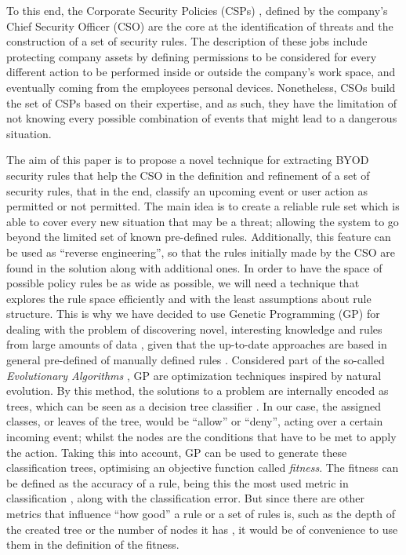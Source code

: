 \documentclass[a4paper,10pt,twocolumn,preprint,3p]{elsarticle}
\begin{document}
To this end, the Corporate Security Policies (CSPs) \cite{Kaeo:2003:DNS:1201807}, 
defined by the company's Chief Security Officer (CSO) are the core at the
identification of threats and the construction of a set of security rules. The description of these jobs include protecting
company assets by defining permissions to be considered for every
different action to be performed inside or outside the company's work
space, and eventually coming from the employees personal
devices. Nonetheless, CSOs build the set of CSPs based on their
expertise, and as such, they have the limitation of not knowing every
possible combination of events that might lead to a dangerous
situation. 

The aim of this paper is to propose a novel technique for extracting
BYOD security rules that help the CSO in the definition and refinement
of a set of security rules, that in the end, classify an upcoming
event or user action as permitted or not permitted.
The main idea is to create a reliable rule set
which is able to cover every new situation that may be a threat;
allowing the system to go beyond the limited set of known pre-defined %
rules. Additionally, this feature can be used as ``reverse engineering'', so that the rules initially made by the CSO are found in the solution along with additional ones. In order to have the space of possible policy rules be as wide
as possible, we will need a technique that explores the rule space
efficiently and with the least assumptions about rule structure.
This is why we have decided to use Genetic Programming (GP) for dealing with the problem of
discovering novel, interesting knowledge and rules from large
amounts of data \cite{freitas2002data}, given that the up-to-date approaches are based in general pre-defined of manually defined rules \cite{ali2015analysis}. Considered part of the so-called \emph{Evolutionary
  Algorithms} \cite{back1996evolutionary}, GP are optimization
techniques inspired by natural evolution. By this method, the
solutions to a problem are internally encoded as trees, which can be
seen as a decision tree classifier \cite{safavian1990survey}. In our case, the assigned classes, or leaves of the tree, would be ``allow'' or ``deny'', acting over a certain incoming event; whilst the nodes are the conditions that have to be met to apply the action. Taking this into account, GP can be used to generate these classification trees, optimising an objective function called {\em fitness}. The fitness can be defined as the accuracy of a rule, being this the most used metric in classification \cite{witten2005data}, along with the classification error. But since there are other metrics that influence ``how good'' a rule or a set of rules is, such as the depth of the created tree or the number of nodes it has \cite{back1996evolutionary}, it would be of convenience to use them in the definition of the fitness.
\end{document}
